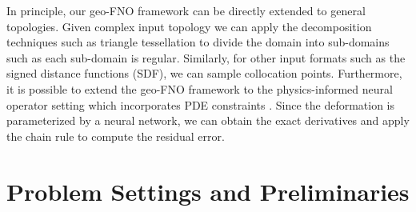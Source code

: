 \documentclass{article}
\newcommand{\aacomment}[1]{\textcolor{red}{{\bf Anima:} #1}}
\newcommand{\T}{\mathcal{T}}
\begin{document}
In principle, our geo-FNO framework can be directly extended to general topologies. Given complex input topology we can apply the decomposition techniques such as triangle tessellation to divide the domain into sub-domains such as each sub-domain is regular. Similarly, for other input formats such as the signed distance functions (SDF), we can sample collocation points. Furthermore, it is possible to extend the geo-FNO framework to the physics-informed neural operator setting which incorporates PDE constraints \citep{li2021physics}. Since the deformation is parameterized by a neural network, we can obtain the exact derivatives and apply the chain rule to compute the residual error.




\section{Problem Settings and Preliminaries}
\end{document}
